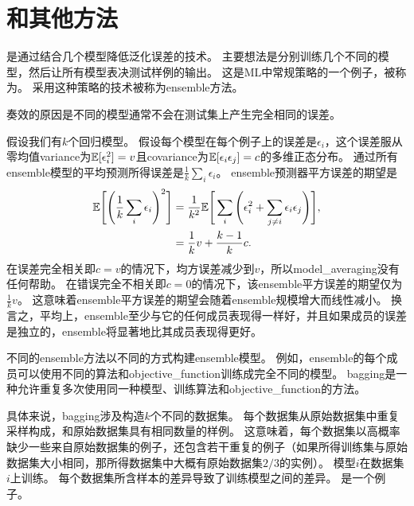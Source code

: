 \section{和其他方法}
\label{sec:bagging_and_other_ensemble_methods}
是通过结合几个模型降低泛化误差的技术\citep{ML:Breiman:bagging}。
主要想法是分别训练几个不同的模型，然后让所有模型表决测试样例的输出。
这是\gls{ML}中常规策略的一个例子，被称为。
采用这种策略的技术被称为\gls{ensemble}方法。

奏效的原因是不同的模型通常不会在测试集上产生完全相同的误差。

假设我们有$k$个回归模型。
假设每个模型在每个例子上的误差是$\epsilon_i$，这个误差服从零均值\gls{variance}为$\mathbb{E}[\epsilon_i^2] = v$且\gls{covariance}为$\mathbb{E}[\epsilon_i \epsilon_j] = c$的多维正态分布。
通过所有\gls{ensemble}模型的平均预测所得误差是$\frac{1}{k} \sum_i \epsilon_i$。 
\gls{ensemble}预测器平方误差的期望是
\begin{align}
 \mathbb{E} \Bigg[\Bigg(\frac{1}{k} \sum_i \epsilon_i \Bigg)^2\Bigg] &= \frac{1}{k^2} 
 \mathbb{E} \Bigg[\sum_i \Bigg(\epsilon_i^2 + \sum_{j \neq i} \epsilon_i \epsilon_j\Bigg)\Bigg], \\
&= \frac{1}{k} v + \frac{k-1}{k} c .                             
\end{align}
在误差完全相关即$c=v$的情况下，均方误差减少到$v$，所以\gls{model_averaging}没有任何帮助。
在错误完全不相关即$c =0$的情况下，该\gls{ensemble}平方误差的期望仅为$\frac{1}{k}v$。
这意味着\gls{ensemble}平方误差的期望会随着\gls{ensemble}规模增大而线性减小。
换言之，平均上，\gls{ensemble}至少与它的任何成员表现得一样好，并且如果成员的误差是独立的，\gls{ensemble}将显著地比其成员表现得更好。

不同的\gls{ensemble}方法以不同的方式构建\gls{ensemble}模型。
例如，\gls{ensemble}的每个成员可以使用不同的算法和\gls{objective_function}训练成完全不同的模型。
\gls{bagging}是一种允许重复多次使用同一种模型、训练算法和\gls{objective_function}的方法。


具体来说，\gls{bagging}涉及构造$k$个不同的数据集。
每个数据集从原始数据集中重复采样构成，和原始数据集具有相同数量的样例。
这意味着，每个数据集以高概率缺少一些来自原始数据集的例子，还包含若干重复的例子（如果所得训练集与原始数据集大小相同，那所得数据集中大概有原始数据集$2/3$的实例）。
模型$i$在数据集$i$上训练。
每个数据集所含样本的差异导致了训练模型之间的差异。
是一个例子。

